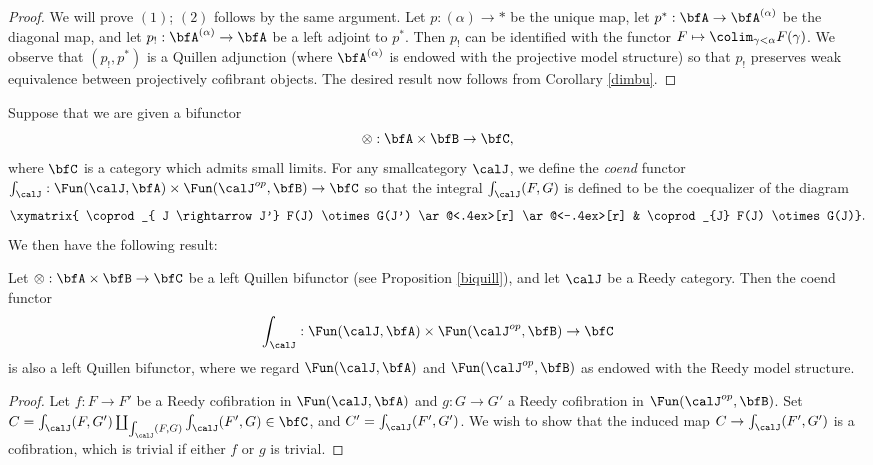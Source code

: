 \begin{Model Categories}
\begin{Didn't Read}
\begin{proof}
We will prove $(1)$; $(2)$ follows by the same argument. Let $p: (\alpha) \rightarrow \ast$ be
the unique map, let $p^{\ast}: \bfA \rightarrow \bfA^{(\alpha)}$ be the diagonal map, and let
$p_{!}: \bfA^{(\alpha)} \rightarrow \bfA$ be a left adjoint to $p^{\ast}$. Then $p_{!}$ can be identified with the functor $F \mapsto \colim_{\gamma < \alpha} F(\gamma)$. We observe that $(p_!, p^{\ast})$ is a Quillen adjunction (where
$\bfA^{(\alpha)}$ is endowed with the projective model structure) so that
$p_{!}$ preserves weak equivalence between projectively cofibrant objects. The desired result now follows from Corollary \ref{dimbu}.
\end{proof}

Suppose that we are given a bifunctor
$$ \otimes: \bfA \times \bfB \rightarrow \bfC, $$
where $\bfC$ is a category which admits small limits. For any smallcategory $\calJ$, we define the
{\em coend} functor $\int_{\calJ}: \Fun(\calJ, \bfA) \times \Fun( \calJ^{op}, \bfB) \rightarrow \bfC$
so that the integral $\int_{\calJ}(F,G)$ is defined to be the coequalizer of the diagram
$$\xymatrix{ \coprod_{ J \rightarrow J'} F(J) \otimes G(J') 
\ar@<.4ex>[r] \ar@<-.4ex>[r] & \coprod_{J} F(J) \otimes G(J)}.$$
We then have the following result:

\begin{proposition}\label{intreed}
Let $\otimes: \bfA \times \bfB \rightarrow \bfC$ be a left Quillen bifunctor
(see Proposition \ref{biquill}), and let $\calJ$ be a Reedy category. Then the
coend functor
$$ \int_{\calJ}: \Fun( \calJ, \bfA) \times \Fun( \calJ^{op}, \bfB) \rightarrow \bfC$$
is also a left Quillen bifunctor, where we regard $\Fun(\calJ, \bfA)$ and
$\Fun(\calJ^{op}, \bfB)$ as endowed with the Reedy model structure.
\end{proposition}

\begin{proof}
Let $f: F \rightarrow F'$ be a Reedy cofibration in
$\Fun(\calJ, \bfA)$ and $g: G \rightarrow G'$ a Reedy cofibration in
$\Fun(\calJ^{op}, \bfB)$. Set $C = \int_{\calJ}(F,G') \coprod_{ \int_{\calJ}(F,G) } \int_{\calJ}(F',G) \in \bfC$, and $C' = \int_{\calJ}(F',G')$. We wish to show that the induced map
$C \rightarrow \int_{\calJ}(F',G')$ is a cofibration, which is trivial if either
$f$ or $g$ is trivial. 


\end{proof}
\end{Didn't Read}
\end{Model Categories}
